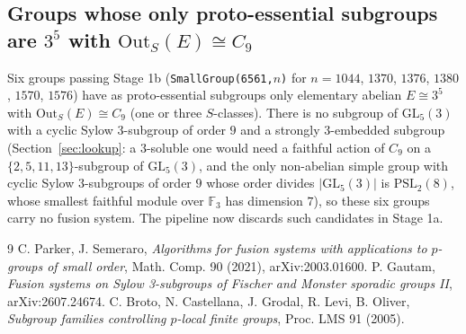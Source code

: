 \documentclass[11pt]{article}
\theoremstyle{definition}
\theoremstyle{remark}
\newcommand{\Out}{\mathrm{Out}}
\newcommand{\GL}{\mathrm{GL}}
\newcommand{\PSL}{\mathrm{PSL}}
\begin{document}
\subsection{Groups whose only proto-essential subgroups are $3^5$ with $\Out_S(E)\cong C_9$}
\label{sec:tierC9}

Six groups passing Stage 1b (\texttt{SmallGroup(6561,}$n$\texttt{)} for
$n=1044$, $1370$, $1376$, $1380$, $1570$, $1576$) have as proto-essential
subgroups only elementary abelian $E\cong3^5$ with $\Out_S(E)\cong C_9$
(one or three $S$-classes).  There is no subgroup of $\GL_5(3)$ with a cyclic
Sylow $3$-subgroup of order $9$ and a strongly $3$-embedded subgroup
(Section~\ref{sec:lookup}: a $3$-soluble one would need a faithful action of
$C_9$ on a $\{2,5,11,13\}$-subgroup of $\GL_5(3)$, and the only non-abelian
simple group with cyclic Sylow $3$-subgroups of order $9$ whose order
divides $|\GL_5(3)|$ is $\PSL_2(8)$, whose smallest faithful module over
$\mathbb{F}_3$ has dimension $7$), so these six groups carry no fusion
system.  The pipeline now discards such candidates in Stage 1a.

\begin{thebibliography}{9}
 C. Parker, J. Semeraro, \emph{Algorithms for fusion systems with
applications to $p$-groups of small order}, Math. Comp. 90 (2021), arXiv:2003.01600.
 P. Gautam, \emph{Fusion systems on Sylow 3-subgroups of
Fischer and Monster sporadic groups II}, arXiv:2607.24674.
 C. Broto, N. Castellana, J. Grodal, R. Levi, B. Oliver,
\emph{Subgroup families controlling $p$-local finite groups}, Proc. LMS 91 (2005).
\end{thebibliography}
\end{document}
